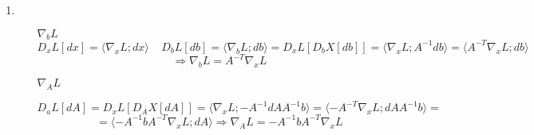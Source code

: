 \documentclass[a4paper,12pt]{article}
\begin{document}
\begin{enumerate}
\item 
	\begin{enumerate}
		\item[$\nabla_b L$]
		$$D_xL[dx] = \langle\nabla_x L; dx\rangle~~~~~D_bL[db] = \langle\nabla_b L; db\rangle = D_xL[D_bX[db]] = \langle\nabla_x L; A^{-1}db\rangle = \langle A^{-T}\nabla_x L; db\rangle$$
			$$\Longrightarrow \nabla_b L = A^{-T}\nabla_x L$$
		
		\item[$\nabla_A L$]
		
		$$D_aL[dA] = D_xL[D_AX[dA]] = \langle\nabla_x L; -A^{-1}dAA^{-1}b\rangle = \langle-A^{-T}\nabla_x L; dAA^{-1}b\rangle = $$
		$$ = \langle-A^{-1}bA^{-T}\nabla_x L; dA\rangle \Longrightarrow \nabla_AL = - A^{-1}bA^{-T}\nabla_x L$$
	\end{enumerate}

\end{enumerate}

	
\end{document}
